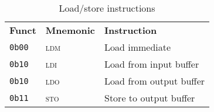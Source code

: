 \begin{table}[ht]
    \centering
    \begin{tabular}{|l l l|}
        \hline
        \textbf{Funct} & \textbf{Mnemonic} & \textbf{Instruction} \\
        \texttt{0b00} & \textsc{ldm} & Load immediate \\
        \texttt{0b10} & \textsc{ldi} & Load from input buffer \\
        \texttt{0b10} & \textsc{ldo} & Load from output buffer \\
        \texttt{0b11} & \textsc{sto} & Store to output buffer \\
        \hline
    \end{tabular}

    \caption{Load/store instructions}
    \label{tab:ls_instrs}
\end{table}